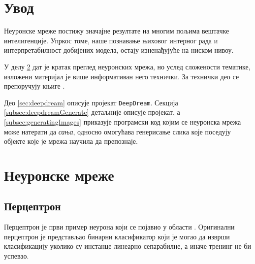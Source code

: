 \documentclass[a4paper]{article}
\begin{document}
\newpage
\tableofcontents

\newpage

\section{Увод}
Неуронске мреже постижу значајне резултате на многим пољима вештачке интелигенције.
Упркос томе, наше познавање њиховог интерног рада и интерпретабилност добијених модела, 
остају изненађујуће на ниском нивоу.

У делу \ref{sec:nn} дат је кратак преглед неуронских мрежа,
но услед сложености тематике, изложени материјал је више информативан него технички. За технички део
се препоручују књиге \cite{bishop, statisticalLearning, murphy}.

Део \ref{sec:deepdream} описује пројекат \texttt{DeepDream}.
Секција \ref{subsec:deepdreamGenerate} детаљније описује пројекат,
а \ref{subsec:generatingImages} приказује програмски код којим се неуронска мрежа
може натерати да \textit{сања}, односно омогућава генерисање слика које
поседују објекте које је мрежа научила да препознаје.

\section{Неуронске мреже}
\label{sec:nn}

\subsection{Перцептрон}
Перцептрон је први пример неурона који се појавио у области \cite{perceptronOriginal}. Оригинални перцептрон је
представљао бинарни класификатор који је могао да изврши класификацију уколико су инстанце линеарно сепарабилне,
а иначе тренинг не би успевао.
\end{document}
